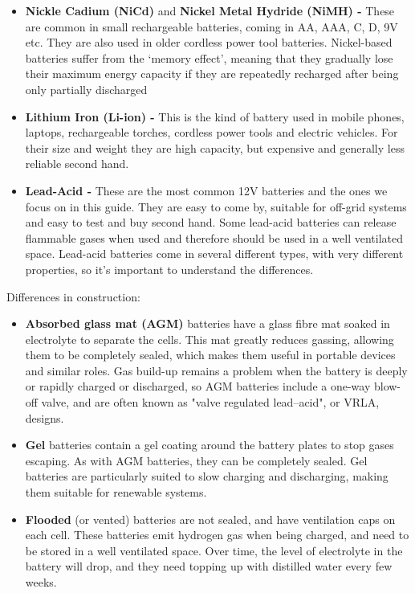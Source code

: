 \documentclass{article}
\theoremstyle{definition}
\theoremstyle{definition}
\theoremstyle{remark}
\begin{document}
      \begin{itemize}[label={}]
        \item \textbf{Nickle Cadium (NiCd)} and \textbf{Nickel Metal Hydride (NiMH) -} These are common in small rechargeable batteries, coming in AA, AAA, C, D, 9V etc. They are also used in older cordless power tool batteries. Nickel-based batteries suffer from the ‘memory effect’, meaning that they gradually lose their maximum energy capacity if they are repeatedly recharged after being only partially discharged

        \item \textbf{Lithium Iron (Li-ion) -} This is the kind of battery used in mobile phones, laptops, rechargeable torches, cordless power tools and electric vehicles. For their size and weight they are high capacity, but expensive and generally less reliable second hand. 

        \item \textbf{Lead-Acid -} These are the most common 12V batteries and the ones we focus on in this guide. They are easy to come by, suitable for off-grid systems and easy to test and buy second hand. Some lead-acid batteries can release flammable gases when used and therefore should be used in a well ventilated space. Lead-acid batteries come in several different types, with very different properties, so it’s important to understand the differences. 
      \end{itemize}

      Differences in construction:

      \begin{itemize}[label={}]
        \item \textbf{Absorbed glass mat (AGM)} batteries have a glass fibre mat soaked in electrolyte to separate the cells. This mat greatly reduces gassing, allowing them to be completely sealed, which makes them useful in portable devices and similar roles. Gas build-up remains a problem when the battery is deeply or rapidly charged or discharged, so AGM batteries include a one-way blow-off valve, and are often known as "valve regulated lead–acid", or VRLA, designs.

        \item \textbf{Gel} batteries contain a gel coating around the battery plates to stop gases escaping. As with AGM batteries, they can be completely sealed. Gel batteries are particularly suited to slow charging and discharging, making them suitable for renewable systems.

        \item \textbf{Flooded} (or vented) batteries are not sealed, and have ventilation caps on each cell. These batteries emit hydrogen gas when being charged, and need to be stored in a well ventilated space. Over time, the level of electrolyte in the battery will drop, and they need topping up with distilled water every few weeks.
      \end{itemize}
\end{document}
